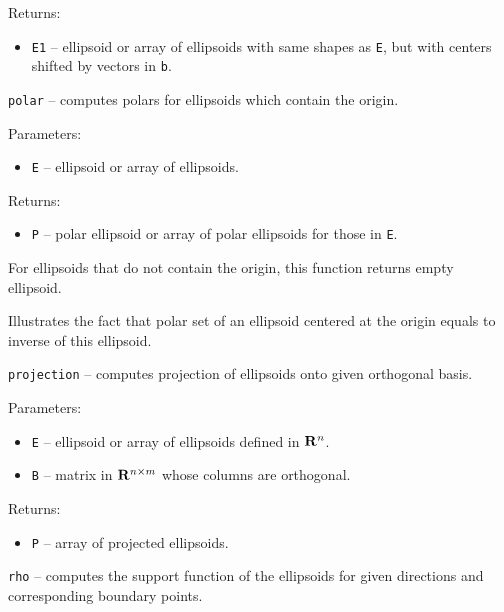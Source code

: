 Returns:
\begin{itemize}
\item {\tt E1} -- ellipsoid or array of ellipsoids with same shapes as {\tt E},
but with centers shifted by vectors in {\tt b}.
\end{itemize}



\newpage

{\Large {\tt polar}} -- computes polars for ellipsoids which contain the origin.

Parameters:
\begin{itemize}
\item {\tt E} -- ellipsoid or array of ellipsoids.
\end{itemize}

Returns:
\begin{itemize}
\item {\tt P} -- polar ellipsoid or array of polar ellipsoids for those
in {\tt E}.
\end{itemize}

For ellipsoids that do not contain the origin, this function returns empty
ellipsoid.

Illustrates the fact that polar set of an ellipsoid centered at the origin
equals to inverse of this ellipsoid.

\newpage

{\Large {\tt projection}} -- computes projection of ellipsoids onto given
orthogonal basis.

Parameters:
\begin{itemize}
\item {\tt E} -- ellipsoid or array of ellipsoids defined in ${\bf R}^n$.
\item {\tt B} -- matrix in ${\bf R}^{n\times m}$ whose columns are orthogonal.
\end{itemize}

Returns:
\begin{itemize}
\item {\tt P} -- array of projected ellipsoids.
\end{itemize}


\newpage

{\Large {\tt rho}} -- computes the support function of the ellipsoids for
given directions and corresponding boundary points.

